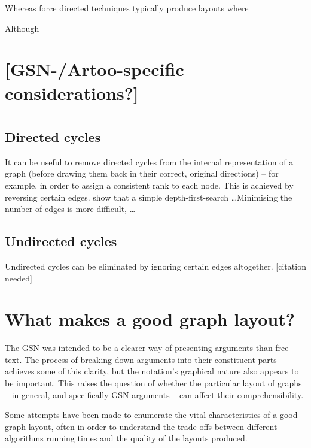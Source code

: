 Whereas force directed techniques typically produce layouts where 


Although 



\section{[GSN-/Artoo-specific considerations?]}


\section{}




\subsection{Directed cycles}

It can be useful to remove directed cycles from the internal representation of a graph
(before drawing them back in their correct, original directions)
-- for example, in order to assign a consistent rank to each node.
This is achieved by reversing certain edges.
\citet{gansner1993} show that a simple depth-first-search \ldots  Minimising the number of edges is more difficult, \citeauthor{gansner1993} \ldots



\subsection{Undirected cycles}

Undirected cycles can be eliminated by ignoring certain edges altogether.  [citation needed]



\section{What makes a good graph layout?}

The GSN was intended to be a clearer way of presenting arguments than free text.
The process of breaking down arguments into their constituent parts achieves some of this clarity,
but the notation's graphical nature also appears to be important.
This raises the question of whether the particular layout of graphs -- in general, and specifically GSN arguments -- can affect their comprehensibility.

Some attempts have been made to enumerate the vital characteristics of a good graph layout, often in order to understand the trade-offs between different algorithms running times and the quality of the layouts produced.


